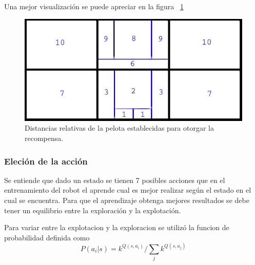 Una mejor visualizaci\'on se puede apreciar en la figura ~\ref{fig:distancias}
\begin{figure}[hbtp]
\centering
\includegraphics[scale=0.5]{imagenes/Distancias.jpg}
\caption{Distancias relativas de la pelota establecidas para otorgar la recompensa.}
\label{fig:distancias}
\end{figure}


\subsubsection{Eleci\'on de la acci\'on}


Se entiende que dado un estado se tienen 7 posibles acciones que en el entrenamiento del robot el aprende cual es mejor realizar según el estado en el cual se encuentra. Para que el aprendizaje obtenga mejores resultados se debe tener un equilibrio entre la exploración y la explotación. 

Para variar entre la explotacion y la exploracion se utiliz\'o la funcion de probabilidad definida como  \[P(a_{i} | s) = k^{Q(s,a_{i})}/ \sum_{j}k^{Q(s,a_{j})}  \] 
 
 
 
 
 